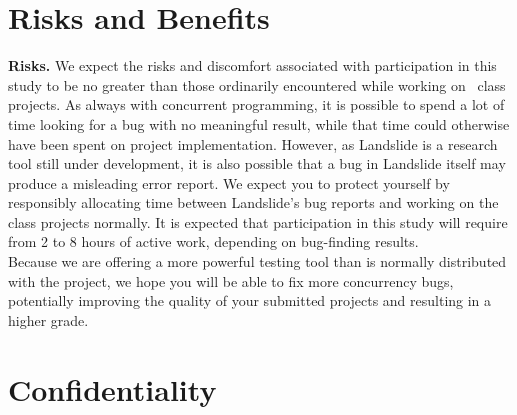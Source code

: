 \documentclass{article}
\begin{document}
\section{Risks and Benefits}

{\bf Risks.}
We expect the risks and discomfort associated with participation in this study to be no greater than those ordinarily encountered while working on \classname~class projects.
As always with concurrent programming, it is possible to spend a lot of time looking for a bug with no meaningful result, while that time could otherwise have been spent on project implementation.
However, as Landslide is a research tool still under development, it is also possible that a bug in Landslide itself may produce a misleading error report. We expect you to protect yourself by responsibly allocating time between Landslide's bug reports and working on the class projects normally. It is expected that participation in this study will require from 2 to 8 hours of active work, depending on bug-finding results.
\\

Because we are offering a more powerful testing tool than is normally distributed with the project, we hope you will be able to fix more concurrency bugs, potentially improving the quality of your submitted projects and resulting in a higher grade.

\section{Confidentiality}
\end{document}
